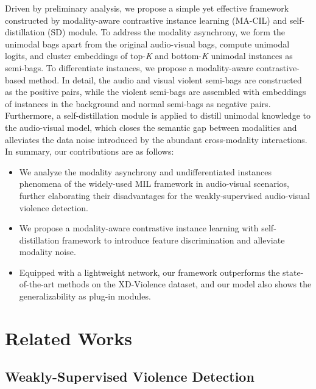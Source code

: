 \documentclass[sigconf]{acmart}
\begin{document}
Driven by preliminary analysis, we propose a simple yet effective framework constructed by modality-aware contrastive instance learning (MA-CIL) and self-distillation (SD) module. To address the modality asynchrony, we form the unimodal bags apart from the original audio-visual bags, compute unimodal logits, and cluster embeddings of top-\textit{K} and bottom-\textit{K} unimodal instances as semi-bags. To differentiate instances, we propose a modality-aware contrastive-based method. In detail, the audio and visual violent semi-bags are constructed as the positive pairs, while the violent semi-bags are assembled with embeddings of instances in the background and normal semi-bags as negative pairs. Furthermore, a self-distillation module is applied to distill unimodal knowledge to the audio-visual model, which closes the semantic gap between modalities and alleviates the data noise introduced by the abundant cross-modality interactions. In summary, our contributions are as follows:
\begin{itemize}[leftmargin=*]
\item We analyze the modality asynchrony and undifferentiated instances phenomena of the widely-used MIL framework in audio-visual scenarios, further elaborating their disadvantages for the weakly-supervised audio-visual violence detection.
\item We propose a modality-aware contrastive instance learning with self-distillation framework to introduce feature discrimination and alleviate modality noise.
\item Equipped with a lightweight network, our framework outperforms the state-of-the-art methods on the XD-Violence dataset, and our model also shows the generalizability as plug-in modules. 
\end{itemize}

\section{Related Works}

\subsection{Weakly-Supervised Violence Detection} 
\end{document}
